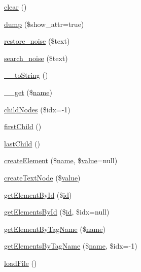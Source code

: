 \begin{DoxyCompactItemize}
\item 
\hyperlink{classsimple__html__dom_aa821bec12eaa7e0f649397c9675ff505}{clear} ()
\item 
\hyperlink{classsimple__html__dom_ad2a305d3f759f9c444d5b2e686586598}{dump} (\$show\+\_\+attr=true)
\item 
\hyperlink{classsimple__html__dom_a65768af772cc55c11fc85d4d8697140e}{restore\+\_\+noise} (\$text)
\item 
\hyperlink{classsimple__html__dom_a7bcdfb5fa10cf704553ff32f5f5d693f}{search\+\_\+noise} (\$text)
\item 
\hyperlink{classsimple__html__dom_a7516ca30af0db3cdbf9a7739b48ce91d}{\+\_\+\+\_\+to\+String} ()
\item 
\hyperlink{classsimple__html__dom_abc8e9e31bb15c8a44c3210ec551407c8}{\+\_\+\+\_\+get} (\$\hyperlink{dom__testcase_8php_a7e76f3957f225b9a14d6fab0a55392ce}{name})
\item 
\hyperlink{classsimple__html__dom_a543b9f022b4d71d19a8f055b3b87bb77}{child\+Nodes} (\$idx=-\/1)
\item 
\hyperlink{classsimple__html__dom_a2e7ff3e4db465652634f86004ccb83db}{first\+Child} ()
\item 
\hyperlink{classsimple__html__dom_aa290d153aa9b41988d2b4bfb23424241}{last\+Child} ()
\item 
\hyperlink{classsimple__html__dom_a00ba25421a388987512a3859ff7c2ad9}{create\+Element} (\$\hyperlink{dom__testcase_8php_a7e76f3957f225b9a14d6fab0a55392ce}{name}, \$\hyperlink{dom__testcase_8php_aa1e367627f46ba8a185ec02e58272f80}{value}=null)
\item 
\hyperlink{classsimple__html__dom_af9ee904e108e5c1956eec226881a9442}{create\+Text\+Node} (\$\hyperlink{dom__testcase_8php_aa1e367627f46ba8a185ec02e58272f80}{value})
\item 
\hyperlink{classsimple__html__dom_aec6ca41b9859728595ece521ca638e48}{get\+Element\+By\+Id} (\$\hyperlink{invalid__testcase_8php_af94d69fa7897fa25e80204500b8586eb}{id})
\item 
\hyperlink{classsimple__html__dom_a12433180a44804217a6089284c1e337a}{get\+Elements\+By\+Id} (\$\hyperlink{invalid__testcase_8php_af94d69fa7897fa25e80204500b8586eb}{id}, \$idx=null)
\item 
\hyperlink{classsimple__html__dom_a73eb6caf89c86044a5ed0092484f375d}{get\+Element\+By\+Tag\+Name} (\$\hyperlink{dom__testcase_8php_a7e76f3957f225b9a14d6fab0a55392ce}{name})
\item 
\hyperlink{classsimple__html__dom_a3f59e79eb934dd4d4ef322f20d368849}{get\+Elements\+By\+Tag\+Name} (\$\hyperlink{dom__testcase_8php_a7e76f3957f225b9a14d6fab0a55392ce}{name}, \$idx=-\/1)
\item 
\hyperlink{classsimple__html__dom_a4ab90327dc2941e600549ddf19e75bbd}{load\+File} ()
\end{DoxyCompactItemize}
